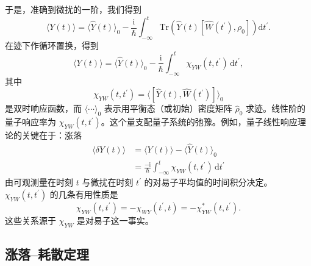 于是，准确到微扰的一阶，我们得到
\begin{equation*}
\langle Y(t)\rangle=\langle\widehat{Y}(t)\rangle_0-\frac{\mathrm{i}}{\hbar}\int_{-\infty}^{t}\mathrm{Tr}\left(\widehat{Y}(t)\left[\widehat{W}(t^{\prime}),\rho_0\right]\right)\mathrm{d}t^{\prime}.\tag{9.49}
\end{equation*}
在迹下作循环置换，得到
\begin{equation*}
\langle Y(t)\rangle=\langle\widehat{Y}(t)\rangle_0-\frac{\mathrm{i}}{\hbar}\int_{-\infty}^{t}\chi_{YW}(t,t^{\prime})\,\mathrm{d}t^{\prime},\tag{9.50}
\end{equation*}
其中
\begin{equation*}
\chi_{YW}(t,t^{\prime})=\langle[\widehat{Y}(t),\widehat{W}(t^{\prime})]\rangle_0\tag{9.51}
\end{equation*}
是双时响应函数，而 $\langle\cdots\rangle_0$ 表示用平衡态（或初始）密度矩阵 $\widehat{\rho}_0$ 求迹。线性阶的量子响应率为 $\chi_{YW}(t,t^{\prime})$。这个量支配量子系统的弛豫。例如，量子线性响应理论的关键在于：涨落
\begin{equation*}
\begin{aligned}
\langle\delta Y(t)\rangle&=\langle Y(t)\rangle-\langle\widehat{Y}(t)\rangle_0\\
&=\frac{-\mathrm{i}}{\hbar}\int_{-\infty}^{t}\chi_{YW}(t,t^{\prime})\,\mathrm{d}t^{\prime}
\end{aligned}\tag{9.52}
\end{equation*}
由可观测量在时刻 $t$ 与微扰在时刻 $t^{\prime}$ 的对易子平均值的时间积分决定。$\chi_{YW}(t,t^{\prime})$ 的几条有用性质是
\begin{equation*}
\chi_{YW}(t,t^{\prime})=-\chi_{WY}(t^{\prime},t)=-\chi^{*}_{YW}(t,t^{\prime}).\tag{9.53}
\end{equation*}
这些关系源于 $\chi_{YW}$ 是对易子这一事实。

\subsection{涨落–耗散定理}

